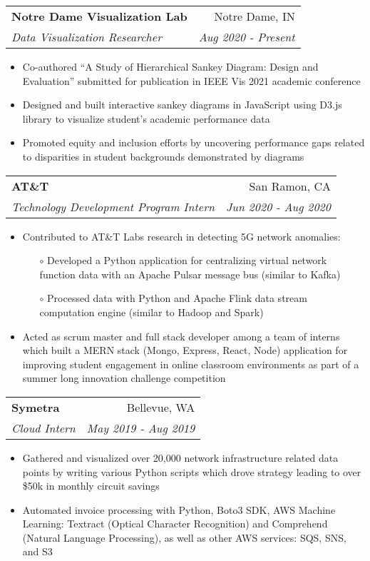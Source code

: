 \documentclass[letterpaper,10pt]{article}
\makeatletter
\newcommand{\resumeItem}[2]{
  \item\small{
    {#1}{#2 \vspace{-2pt}}
  }
}
\newcommand{\resumeSubheading}[4]{
  \vspace{-1pt}\item[]
  \begin{tabular*}{0.98\textwidth}{l@{\extracolsep{\fill}}r}
      \hspace{-10pt}\textbf{#1} & #2 \\
      \hspace{-10pt}\textit{\small#3} & \textit{\small #4} \\
    \end{tabular*}\vspace{-5pt}
}
\newcommand{\resumeItemListStart}{\begin{itemize}}
\newcommand{\resumeItemListEnd}{\end{itemize}\vspace{-5pt}}
\makeatother
\begin{document}
{    %
    \resumeSubheading
    {Notre Dame Visualization Lab}{Notre Dame, IN}
    {Data Visualization Researcher}{Aug 2020 - Present}
      \resumeItemListStart
      \resumeItem{}
        {Co-authored ``A Study of Hierarchical Sankey Diagram: Design and Evaluation'' submitted for publication in IEEE Vis 2021 academic conference}
      \resumeItem{}
        {Designed and built interactive sankey diagrams in JavaScript using D3.js library to visualize student's academic performance data}
      \resumeItem{}
        {Promoted equity and inclusion efforts by uncovering performance gaps related to disparities in student backgrounds demonstrated by diagrams}
    \resumeItemListEnd

    \vspace{2pt}

    \resumeSubheading
      {AT\&T}{San Ramon, CA}
      {Technology Development Program Intern}{Jun 2020 - Aug 2020}
      \resumeItemListStart

        \resumeItem{}
          {Contributed to AT\&T Labs research in detecting 5G network anomalies: }
          \begin{itemize}
            \item[$\circ$] Developed a Python application for centralizing virtual network function data with an Apache Pulsar message bus (similar to Kafka)
            \item[$\circ$] Processed data with Python and Apache Flink data stream computation engine (similar to Hadoop and Spark)
          \end{itemize}
        \vspace{-3pt}
        \resumeItem{}
          {Acted as scrum master and full stack developer among a team of interns which built a MERN stack (Mongo, Express, React, Node) application for improving student engagement in online classroom environments as part of a summer long innovation challenge competition}
      \resumeItemListEnd
      
    \vspace{2pt}

    \resumeSubheading
      {Symetra}{Bellevue, WA}
      {Cloud Intern}{May 2019 - Aug 2019}
        \resumeItemListStart
        \resumeItem{}
          {Gathered and visualized over 20,000 network infrastructure related data points by writing various Python scripts which drove strategy leading to over \$50k in monthly circuit savings}
        \resumeItem{}
          {Automated invoice processing with Python, Boto3 SDK, AWS Machine Learning: Textract (Optical Character Recognition) and Comprehend (Natural Language Processing), as well as other AWS services: SQS, SNS, and S3}
      \resumeItemListEnd

}
\end{document}
